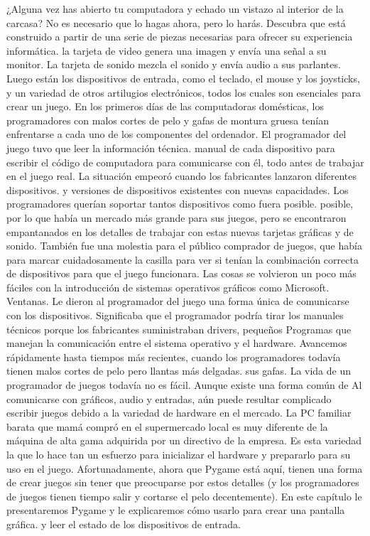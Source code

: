 ¿Alguna vez has abierto tu computadora y echado un vistazo al interior de la carcasa? No es necesario que lo hagas ahora, pero lo harás.
Descubra que está construido a partir de una serie de piezas necesarias para ofrecer su experiencia informática. la tarjeta de video
genera una imagen y envía una señal a su monitor. La tarjeta de sonido mezcla el sonido y envía
audio a sus parlantes. Luego están los dispositivos de entrada, como el teclado, el mouse y los joysticks, y un
variedad de otros artilugios electrónicos, todos los cuales son esenciales para crear un juego.
En los primeros días de las computadoras domésticas, los programadores con malos cortes de pelo y gafas de montura gruesa tenían
enfrentarse a cada uno de los componentes del ordenador. El programador del juego tuvo que leer la información técnica.
manual de cada dispositivo para escribir el código de computadora para comunicarse con él, todo antes de trabajar
en el juego real. La situación empeoró cuando los fabricantes lanzaron diferentes dispositivos.
y versiones de dispositivos existentes con nuevas capacidades. Los programadores querían soportar tantos dispositivos como fuera posible.
posible, por lo que había un mercado más grande para sus juegos, pero se encontraron empantanados en los detalles
de trabajar con estas nuevas tarjetas gráficas y de sonido. También fue una molestia para el público comprador de juegos, que había
para marcar cuidadosamente la casilla para ver si tenían la combinación correcta de dispositivos para que el juego funcionara.
Las cosas se volvieron un poco más fáciles con la introducción de sistemas operativos gráficos como Microsoft.
Ventanas. Le dieron al programador del juego una forma única de comunicarse con los dispositivos. Significaba que
el programador podría tirar los manuales técnicos porque los fabricantes suministraban drivers, pequeños
Programas que manejan la comunicación entre el sistema operativo y el hardware.
Avancemos rápidamente hasta tiempos más recientes, cuando los programadores todavía tienen malos cortes de pelo pero llantas más delgadas.
sus gafas. La vida de un programador de juegos todavía no es fácil. Aunque existe una forma común de
Al comunicarse con gráficos, audio y entradas, aún puede resultar complicado escribir juegos debido a la variedad
de hardware en el mercado. La PC familiar barata que mamá compró en el supermercado local es muy diferente
de la máquina de alta gama adquirida por un directivo de la empresa. Es esta variedad la que lo hace tan
un esfuerzo para inicializar el hardware y prepararlo para su uso en el juego. Afortunadamente, ahora que Pygame está aquí,
tienen una forma de crear juegos sin tener que preocuparse por estos detalles (y los programadores de juegos tienen tiempo
salir y cortarse el pelo decentemente).
En este capítulo le presentaremos Pygame y le explicaremos cómo usarlo para crear una pantalla gráfica.
y leer el estado de los dispositivos de entrada.

